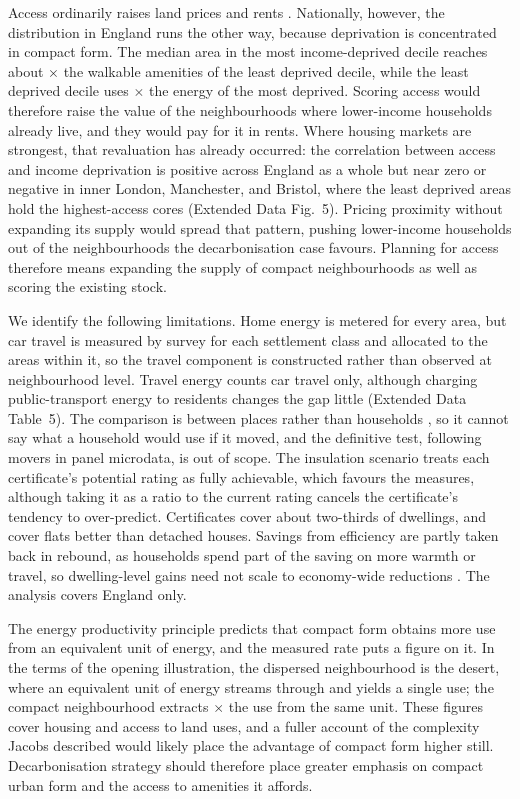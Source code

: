 \documentclass[pdflatex,sn-nature]{sn-jnl}
\begin{document}
Access ordinarily raises land prices and rents \citep{alonso1964}. Nationally, however, the distribution in England runs the other way, because deprivation is concentrated in compact form. The median area in the most income-deprived decile reaches about \nepiimdAccessRatio$\times$ the walkable amenities of the least deprived decile, while the least deprived decile uses \nepiimdEnergyRatio$\times$ the energy of the most deprived. Scoring access would therefore raise the value of the neighbourhoods where lower-income households already live, and they would pay for it in rents. Where housing markets are strongest, that revaluation has already occurred: the correlation between access and income deprivation is positive across England as a whole but near zero or negative in inner London, Manchester, and Bristol, where the least deprived areas hold the highest-access cores (Extended Data Fig.~5). Pricing proximity without expanding its supply would spread that pattern, pushing lower-income households out of the neighbourhoods the decarbonisation case favours. Planning for access therefore means expanding the supply of compact neighbourhoods as well as scoring the existing stock.

We identify the following limitations. Home energy is metered for every area, but car travel is measured by survey for each settlement class and allocated to the areas within it, so the travel component is constructed rather than observed at neighbourhood level. Travel energy counts car travel only, although charging public-transport energy to residents changes the gap little (Extended Data Table~5). The comparison is between places rather than households \citep{robinson1950,greenland2001}, so it cannot say what a household would use if it moved, and the definitive test, following movers in panel microdata, is out of scope. The insulation scenario treats each certificate's potential rating as fully achievable, which favours the measures, although taking it as a ratio to the current rating cancels the certificate's tendency to over-predict. Certificates cover about two-thirds of dwellings, and cover flats better than detached houses. Savings from efficiency are partly taken back in rebound, as households spend part of the saving on more warmth or travel, so dwelling-level gains need not scale to economy-wide reductions \citep{sorrell2007}. The analysis covers England only.

The energy productivity principle predicts that compact form obtains more use from an equivalent unit of energy, and the measured rate puts a figure on it. In the terms of the opening illustration, the dispersed neighbourhood is the desert, where an equivalent unit of energy streams through and yields a single use; the compact neighbourhood extracts \nepirate$\times$ the use from the same unit. These figures cover housing and access to land uses, and a fuller account of the complexity Jacobs described would likely place the advantage of compact form higher still. Decarbonisation strategy should therefore place greater emphasis on compact urban form and the access to amenities it affords.
\end{document}
